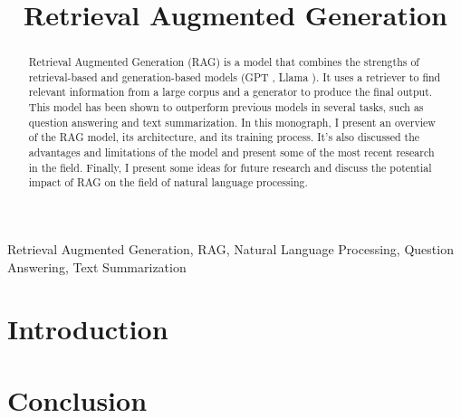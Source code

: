 \documentclass[conference]{IEEEtran}
\begin{document}
\title{Retrieval Augmented Generation}

\author{
    }

\maketitle

\begin{abstract}
    Retrieval Augmented Generation (RAG) is a model that combines the strengths of retrieval-based and generation-based models (GPT \cite{gpt}, Llama \cite{llama}).
    It uses a retriever to find relevant information from a large corpus and a generator to produce the final output.
    This model has been shown to outperform previous models in several tasks, such as question answering and text summarization.
    In this monograph, I present an overview of the RAG model, its architecture, and its training process.
    It's also discussed the advantages and limitations of the model and present some of the most recent research in the field.
    Finally, I present some ideas for future research and discuss the potential impact of RAG on the field of natural language processing.
\end{abstract}

\begin{IEEEkeywords}
    Retrieval Augmented Generation, RAG, Natural Language Processing, Question Answering, Text Summarization
\end{IEEEkeywords}

\section{Introduction}


\section{Conclusion}



\end{document}
